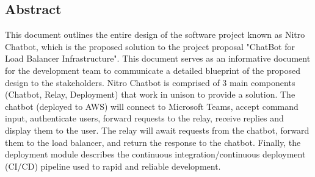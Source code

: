 \subsection{Abstract}
This document outlines the entire design of the software project known as Nitro Chatbot, which is the proposed solution to the project proposal "ChatBot for Load Balancer Infrastructure".
This document serves as an informative document for the development team to communicate a detailed blueprint of the proposed design to the stakeholders.
Nitro Chatbot is comprised of 3 main components (Chatbot, Relay, Deployment) that work in unison to provide a solution.
The chatbot (deployed to AWS) will connect to Microsoft Teams, accept command input, authenticate users, forward requests to the relay, receive replies and display them to the user.
The relay will await requests from the chatbot, forward them to the load balancer, and return the response to the chatbot.
Finally, the deployment module describes the continuous integration/continuous deployment (CI/CD) pipeline used to rapid and reliable development.

